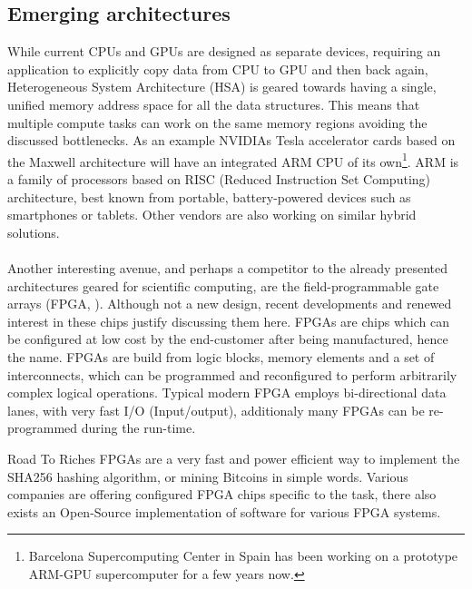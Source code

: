 \subsection{Emerging architectures}

While current CPUs and GPUs are designed as separate devices, requiring an application to explicitly copy data from CPU to GPU and then back again, Heterogeneous System Architecture (HSA) is geared towards having a single, unified memory address space for all the data structures.
This means that multiple compute tasks can work on the same memory regions avoiding the discussed bottlenecks.
As an example NVIDIAs Tesla accelerator cards based on the Maxwell architecture will have an integrated ARM CPU of its own\footnote{Barcelona Supercomputing Center in Spain has been working on a prototype ARM-GPU supercomputer for a few years now.}.
ARM is a family of processors based on RISC (Reduced Instruction Set Computing) architecture, best known from portable, battery-powered devices such as smartphones or tablets. 
Other vendors are also working on similar hybrid solutions.

\paragraph{}
Another interesting avenue, and perhaps a competitor to the already presented architectures geared for scientific computing, are the field-programmable gate arrays (FPGA, \citet{Kuon2008}).
Although not a new design, recent developments and renewed interest in these chips justify discussing them here.
FPGAs are chips which can be configured at low cost by the end-customer after being manufactured, hence the name.
FPGAs are build from logic blocks, memory elements and a set of interconnects, which can be programmed and reconfigured to perform arbitrarily complex logical operations.
Typical modern FPGA employs bi-directional data lanes, with very fast I/O (Input/output), additionaly many FPGAs can be re-programmed during the run-time. 

\begin{remark}{Road To Riches}
FPGAs are a very fast and power efficient way to implement the SHA256 hashing algorithm, or mining Bitcoins in simple words.
Various companies are offering configured FPGA chips specific to the task, there also exists an Open-Source implementation of software for various FPGA systems.
\end{remark}

